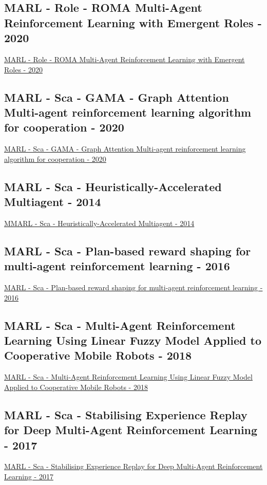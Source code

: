 \subsection{MARL - Role - ROMA Multi-Agent Reinforcement Learning with Emergent Roles - 2020}
\href{http://proceedings.mlr.press/v119/wang20f.html}{MARL - Role - ROMA Multi-Agent Reinforcement Learning with Emergent Roles - 2020}

\subsection{MARL - Sca - GAMA - Graph Attention Multi-agent reinforcement learning algorithm for cooperation - 2020}
\href{https://link.springer.com/article/10.1007/s10489-020-01755-8}{MARL - Sca - GAMA - Graph Attention Multi-agent reinforcement learning algorithm for cooperation - 2020}
\subsection{MARL - Sca - Heuristically-Accelerated Multiagent - 2014}
\href{https://ieeexplore.ieee.org/abstract/document/6502216}{MMARL - Sca - Heuristically-Accelerated Multiagent - 2014}



\subsection{MARL - Sca - Plan-based reward shaping for multi-agent reinforcement learning - 2016}
\href{https://www.cambridge.org/core/journals/knowledge-engineering-review/article/planbased-reward-shaping-for-multiagent-reinforcement-learning/B173D25B1006B755667616C3A3EB3BE5}{MARL - Sca - Plan-based reward shaping for multi-agent reinforcement learning - 2016}

\subsection{MARL - Sca - Multi-Agent Reinforcement Learning Using Linear Fuzzy Model Applied to Cooperative Mobile Robots - 2018}
\href{https://www.mdpi.com/2073-8994/10/10/461}{MARL - Sca - Multi-Agent Reinforcement Learning Using Linear Fuzzy Model Applied to Cooperative Mobile Robots - 2018}

\subsection{MARL - Sca - Stabilising Experience Replay for Deep Multi-Agent Reinforcement Learning - 2017}
\href{http://proceedings.mlr.press/v70/foerster17b.html}{MARL - Sca - Stabilising Experience Replay for Deep Multi-Agent Reinforcement Learning - 2017}

